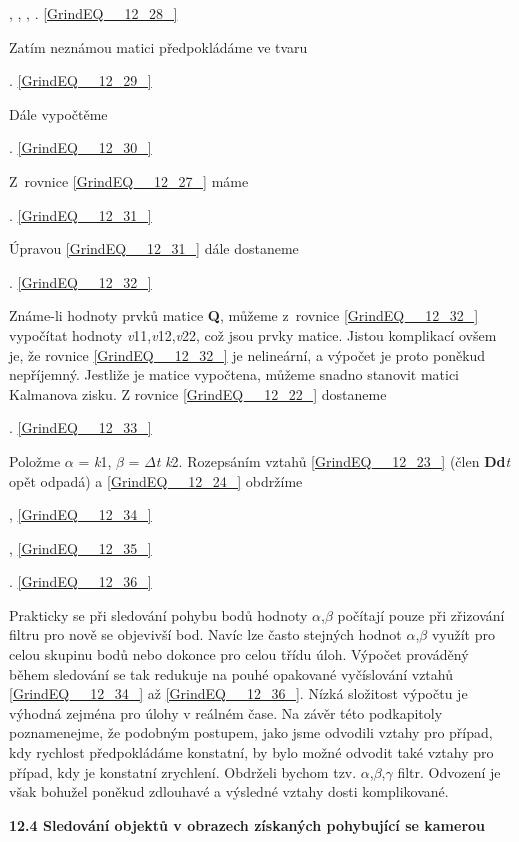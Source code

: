  ,     ,     ,     . \eqref{GrindEQ__12_28_}

\noindent Zatím neznámou matici  předpokládáme ve tvaru 

 . \eqref{GrindEQ__12_29_}

\noindent Dále vypočtěme

 . \eqref{GrindEQ__12_30_}

\noindent Z~rovnice \eqref{GrindEQ__12_27_} máme

 . \eqref{GrindEQ__12_31_}

\noindent Úpravou \eqref{GrindEQ__12_31_} dále dostaneme

 . \eqref{GrindEQ__12_32_}

\noindent Známe-li hodnoty prvků matice \textbf{Q}, můžeme z~rovnice \eqref{GrindEQ__12_32_} vypočítat hodnoty \textit{v}11,\textit{v}12,\textit{v}22, což jsou prvky matice. Jistou komplikací ovšem je, že rovnice \eqref{GrindEQ__12_32_} je nelineární, a výpočet je proto poněkud nepříjemný. Jestliže je matice  vypočtena, můžeme snadno stanovit matici Kalmanova zisku. Z rovnice \eqref{GrindEQ__12_22_} dostaneme

 . \eqref{GrindEQ__12_33_}

\noindent Položme $\alpha$ = \textit{k}1, $\beta$ = $\Delta$\textit{t} \textit{k}2. Rozepsáním vztahů \eqref{GrindEQ__12_23_} (člen \textbf{Dd}\textit{t} opět odpadá) a \eqref{GrindEQ__12_24_} obdržíme 

 , \eqref{GrindEQ__12_34_}

 , \eqref{GrindEQ__12_35_}

 . \eqref{GrindEQ__12_36_}

\noindent Prakticky se při sledování pohybu bodů hodnoty $\alpha$,$\beta$ počítají pouze při zřizování filtru pro nově se objevivší bod. Navíc lze často stejných hodnot $\alpha$,$\beta$ využít pro celou skupinu bodů nebo dokonce pro celou třídu úloh. Výpočet prováděný během sledování se tak redukuje na pouhé opakované vyčíslování vztahů \eqref{GrindEQ__12_34_} až \eqref{GrindEQ__12_36_}. Nízká složitost výpočtu je výhodná zejména pro úlohy v reálném čase. Na závěr této podkapitoly poznamenejme, že podobným postupem, jako jsme odvodili vztahy pro případ, kdy rychlost předpokládáme konstatní, by bylo možné odvodit také vztahy pro případ, kdy je konstatní zrychlení. Obdrželi bychom tzv. $\alpha$,$\beta$,$\gamma$ filtr. Odvození je však bohužel poněkud zdlouhavé a výsledné vztahy dosti komplikované.

\noindent 

\noindent \textbf{12.4  Sledování objektů v obrazech získaných pohybující se kamerou}

